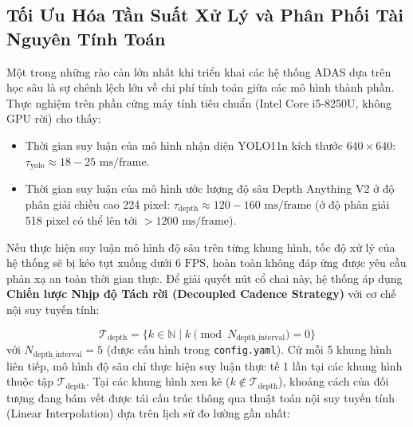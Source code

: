\subsection{Tối Ưu Hóa Tần Suất Xử Lý và Phân Phối Tài Nguyên Tính Toán}
\label{subsec:toi_uu_tai_nguyen}

Một trong những rào cản lớn nhất khi triển khai các hệ thống ADAS dựa trên học sâu là sự chênh lệch lớn về chi phí tính toán giữa các mô hình thành phần. Thực nghiệm trên phần cứng máy tính tiêu chuẩn (Intel Core i5-8250U, không GPU rời) cho thấy:
\begin{itemize}
    \item Thời gian suy luận của mô hình nhận diện YOLO11n kích thước $640 \times 640$: $\tau_{\text{yolo}} \approx 18 - 25 \text{ ms/frame}$.
    \item Thời gian suy luận của mô hình ước lượng độ sâu Depth Anything V2 ở độ phân giải chiều cao 224 pixel: $\tau_{\text{depth}} \approx 120 - 160 \text{ ms/frame}$ (ở độ phân giải 518 pixel có thể lên tới $> 1200 \text{ ms/frame}$).
\end{itemize}

Nếu thực hiện suy luận mô hình độ sâu trên từng khung hình, tốc độ xử lý của hệ thống sẽ bị kéo tụt xuống dưới $6\text{ FPS}$, hoàn toàn không đáp ứng được yêu cầu phản xạ an toàn thời gian thực. Để giải quyết nút cổ chai này, hệ thống áp dụng \textbf{Chiến lược Nhịp độ Tách rời (Decoupled Cadence Strategy)} với cơ chế nội suy tuyến tính:

\begin{equation}
\label{eq:depth_cadence}
\mathcal{T}_{\text{depth}} = \{ k \in \mathbb{N} \mid k \pmod{N_{\text{depth\_interval}}} = 0 \}
\end{equation}
với $N_{\text{depth\_interval}} = 5$ (được cấu hình trong \texttt{config.yaml}). Cứ mỗi 5 khung hình liên tiếp, mô hình độ sâu chỉ thực hiện suy luận thực tế 1 lần tại các khung hình thuộc tập $\mathcal{T}_{\text{depth}}$. Tại các khung hình xen kẽ ($k \notin \mathcal{T}_{\text{depth}}$), khoảng cách của đối tượng đang bám vết được tái cấu trúc thông qua thuật toán nội suy tuyến tính (Linear Interpolation) dựa trên lịch sử đo lường gần nhất:

